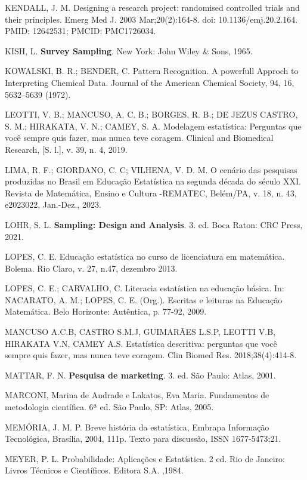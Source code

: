 KENDALL, J. M. Designing a research project: randomised controlled trials and their principles. Emerg Med J. 2003 Mar;20(2):164-8. doi: 10.1136/\-emj.20.2.164. PMID: 12642531; PMCID: PMC1726034.\vskip0.3cm

KISH, L. \textbf{Survey Sampling}. New York: John Wiley \& Sons, 1965. \vskip0.3cm

KOWALSKI, B. R.; BENDER, C. Pattern Recognition. A powerfull Approch to Interpreting Chemical Data. Journal of the American Chemical Society, 94, 16, 5632–5639 (1972).\vskip0.3cm

LEOTTI, V. B.; MANCUSO, A. C. B.; BORGES, R. B.; DE JEZUS CASTRO, S. M.; HIRAKATA, V. N.; CAMEY, S. A. Modelagem estatística: Perguntas que você sempre quis fazer, mas nunca teve coragem. Clinical and Biomedical Research, [S. l.], v. 39, n. 4, 2019.\vskip0.3cm

LIMA, R. F.; GIORDANO, C. C; VILHENA, V. D. M. O cenário das pesquisas produzidas no Brasil em Educação Estatística na segunda década do século XXI. Revista de Matemática, Ensino e Cultura -REMATEC, Belém/PA, v. 18, n. 43, e2023022, Jan.-Dez., 2023.\vskip0.3cm

LOHR, S. L. \textbf{Sampling: Design and Analysis}. 3. ed. Boca Raton: CRC Press, 2021. \vskip0.3cm

LOPES, C. E. Educação estatística no curso de licenciatura em matemática. Bolema. Rio Claro, v. 27, n.47,  dezembro 2013.\vskip0.3cm

LOPES, C. E.; CARVALHO, C. Literacia estatística na educação básica. In: NA\-CA\-RA\-TO, A. M.; LOPES, C. E. (Org.). Escritas e leituras na Educação Matemática. Belo Horizonte:  Autêntica, p. 77-92, 2009.\vskip0.3cm

MANCUSO A.C.B, CASTRO S.M.J, GUIMARÃES L.S.P, LEOTTI V.B, HIRAKATA V.N, CAMEY A.S. Estatística descritiva: perguntas que você sempre quis fazer, mas nunca teve coragem. Clin Biomed Res. 2018;38(4):414-8.\vskip0.3cm

MATTAR, F. N. \textbf{Pesquisa de marketing}. 3. ed. São Paulo: Atlas, 2001. \vskip0.3cm

MARCONI, Marina de Andrade e Lakatos, Eva Maria. Fundamentos de me\-to\-do\-lo\-gi\-a científica. 6ª ed. São Paulo, SP: Atlas, 2005.\vskip0.3cm

\newpage
MEMÓRIA, J. M. P. Breve história da estatística, Embrapa Informação Tecnológica, Brasília, 2004, 111p. Texto para discussão, ISSN 1677-5473;21. \vskip0.3cm

MEYER, P. L. Probabilidade: Aplicações e Estatística. 2 ed. Rio de Janeiro: Livros Técnicos e Científicos. Editora S.A. ,1984.\vskip0.3cm

